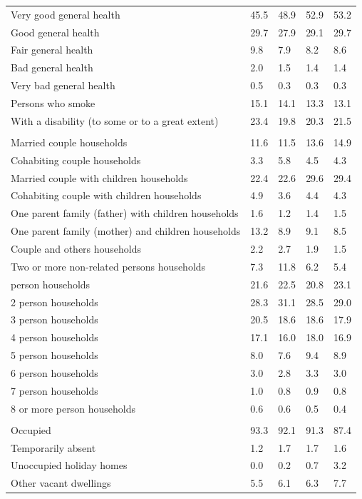 \documentclass{article}
\begin{document}
\begin{table}[h]
\begin{tabular}{KTTTT}
    \hline
Very good general health & 45.5& 48.9&52.9& 53.2\\
Good general health & 29.7& 27.9& 29.1& 29.7\\
Fair general health & 9.8& 7.9&8.2& 8.6\\
Bad general health & 2.0& 1.5&1.4& 1.4\\
Very bad general health & 0.5& 0.3&0.3& 0.3\\
    \hline
Persons who smoke & 15.1& 14.1&13.3& 13.1\\
    \hline
With a disability (to some or to a great extent) & 23.4& 19.8&20.3& 21.5\\
\hline
    \\ 
    \hline
Married couple households & 11.6& 11.5& 13.6& 14.9\\
Cohabiting couple households & 3.3& 5.8& 4.5& 4.3\\
Married couple with children households & 22.4& 22.6& 29.6& 29.4\\
Cohabiting couple with children households & 4.9& 3.6& 4.4& 4.3\\
One parent family (father) with  children households & 1.6& 1.2& 1.4& 1.5\\
One parent family (mother) and children households & 13.2&  8.9&  9.1&  8.5\\
Couple and others households  & 2.2& 2.7& 1.9& 1.5\\
Two or more non-related persons households &  7.3& 11.8&  6.2&  5.4\\
     person households & 21.6& 22.5& 20.8& 23.1\\
2 person households & 28.3& 31.1& 28.5& 29.0\\
3 person households & 20.5& 18.6& 18.6& 17.9\\
4 person households & 17.1& 16.0& 18.0& 16.9\\
5 person households & 8.0& 7.6& 9.4& 8.9\\
6 person households & 3.0& 2.8& 3.3& 3.0\\
7 person households & 1.0& 0.8& 0.9& 0.8\\
8 or more person households & 0.6& 0.6& 0.5& 0.4\\
\hline
    \\ 
    \hline
Occupied & 93.3& 92.1& 91.3& 87.4\\
Temporarily absent & 1.2& 1.7& 1.7& 1.6\\
Unoccupied holiday homes & 0.0& 0.2& 0.7& 3.2\\
Other vacant dwellings & 5.5& 6.1& 6.3& 7.7\\
\hline
\end{tabular}
\end{table}
\end{document}
